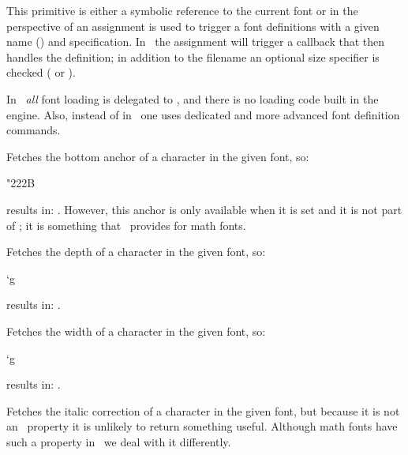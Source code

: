 This primitive is either a symbolic reference to the current font or in the
perspective of an assignment is used to trigger a font definitions with a given
name () and specification. In \LUAMETATEX\ the assignment will trigger
a callback that then handles the definition; in addition to the filename an
optional size specifier is checked ( or ).

In \LUAMETATEX\ {\em all} font loading is delegated to \LUA, and there is no
loading code built in the engine. Also, instead of  in \CONTEXT\ one
uses dedicated and more advanced font definition commands.

\stopoldprimitive

\startnewprimitive[title={\prm {fontcharba}}]

Fetches the bottom anchor of a character in the given font, so:

\startbuffer
\the\fontcharba{} "222B
\stopbuffer

results in: \inlinebuffer. However, this anchor is only available when it is set
and it is not part of \OPENTYPE; it is something that \CONTEXT\ provides for math
fonts.

\stopnewprimitive

\startoldprimitive[title={\prm {fontchardp}}]

Fetches the depth of a character in the given font, so:

\startbuffer
\the\fontchardp\font`g
\stopbuffer

results in: \inlinebuffer.

\stopoldprimitive

\startoldprimitive[title={\prm {fontcharht}}]

Fetches the width of a character in the given font, so:

\startbuffer
\the\fontcharht\font`g
\stopbuffer

results in: \inlinebuffer.

\stopoldprimitive

\startoldprimitive[title={\prm {fontcharic}}]

Fetches the italic correction of a character in the given font, but because it is
not an \OPENTYPE\ property it is unlikely to return something useful. Although
math fonts have such a property in \CONTEXT\ we deal with it differently.

\stopoldprimitive

\startnewprimitive[title={\prm {fontcharta}}]

